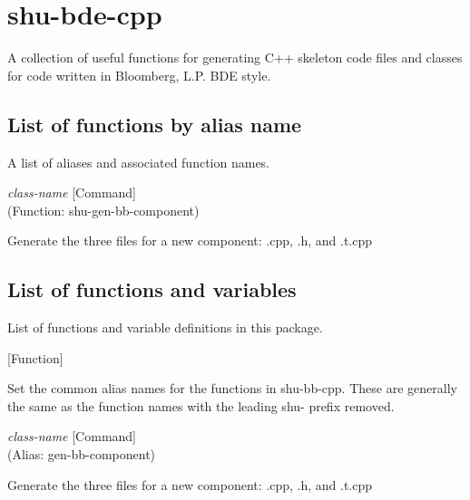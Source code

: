 \eject
\section{shu-bde-cpp}


A collection of useful functions for generating C++ skeleton code files
and classes for code written in Bloomberg, L.P. BDE style.


\subsection{List of functions by alias name}

A list of aliases and associated function names.



\vspace{1em}
\noindent
{}
\usebox{\funcname}\emph{class-name}
 \hfill [Command]\\%
 (Function: shu-gen-bb-component)

\begin{doc-string}
Generate the three files for a new component: .cpp, .h, and .t.cpp
\end{doc-string}

\subsection{List of functions and variables}

List of functions and variable definitions in this package.



\vspace{1em}
\noindent
{}
\usebox{\funcname}
 \hfill [Function]

\begin{doc-string}
Set the common alias names for the functions in shu-bb-cpp.
These are generally the same as the function names with the leading
shu- prefix removed.
\end{doc-string}

\vspace{1em}
\noindent
{}
\usebox{\funcname}\emph{class-name}
 \hfill [Command]\\%
 (Alias: gen-bb-component)

\begin{doc-string}
Generate the three files for a new component: .cpp, .h, and .t.cpp
\end{doc-string}

